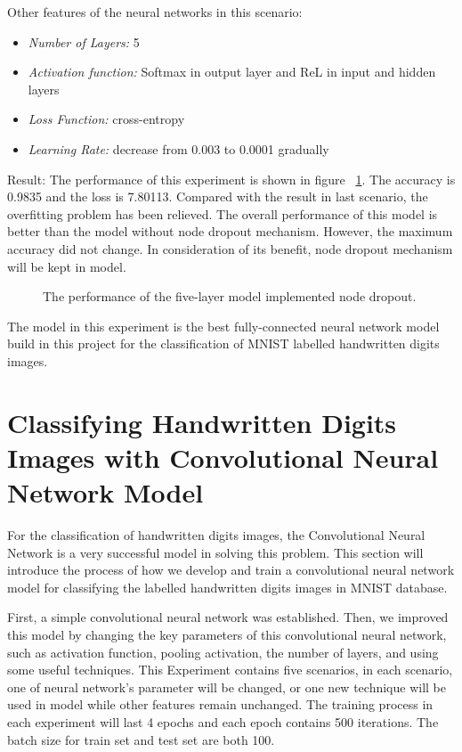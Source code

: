 \documentclass[]{UCD_CS_FYP_Report}
\begin{document}
Other features of the neural networks in this scenario:
\begin{itemize}
\item {\sl Number of Layers:} 5
\item {\sl Activation function:} Softmax in output layer and ReL in input and hidden layers
\item {\sl Loss Function:} cross-entropy
\item {\sl Learning Rate: } decrease from 0.003 to 0.0001 gradually
\end{itemize} 
Result: The performance of this experiment is shown in figure ~\ref{fig:MNIST_fully_connected_S4E1}. The accuracy is 0.9835 and the loss is 7.80113. Compared with the result in last scenario, the overfitting problem has been relieved. The overall performance of this model is better than the model without node dropout mechanism. However, the maximum accuracy did not change. In consideration of its benefit, node dropout mechanism will be kept in model.
\begin{figure}[h]
\centering
\fboxsep 2mm
\caption{\label{fig:MNIST_fully_connected_S4E1} The performance of the five-layer model implemented node dropout.}
\end{figure}
The model in this experiment is the best fully-connected neural network model build in this project for the classification of MNIST labelled  handwritten digits images.
\section{Classifying Handwritten Digits Images with Convolutional Neural Network Model}
For the classification of handwritten digits images, the Convolutional Neural Network is a very successful model in solving this problem. This section will introduce the process of how we develop and train a convolutional neural network model for classifying the labelled handwritten digits images in MNIST database. 

First, a simple convolutional neural network was established. Then, we improved this model by changing the key parameters of this convolutional neural network, such as activation function, pooling activation, the number of layers, and using some useful techniques. This Experiment contains five scenarios, in each scenario, one of neural network's parameter will be changed, or one new technique will be used in model while other features remain unchanged. The training process in each experiment will last 4 epochs and each epoch contains 500 iterations.  The batch size for train set and test set are both 100.
\end{document}
